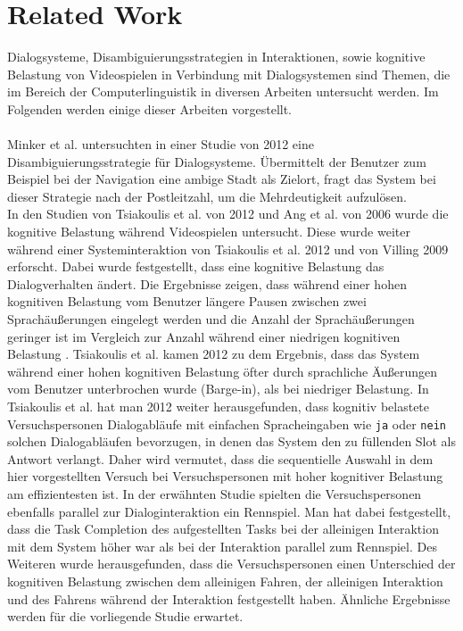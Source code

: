 \documentclass[12pt,a4paper]{scrartcl}
\begin{document}
\newpage
\section{Related Work}

Dialogsysteme, Disambiguierungsstrategien in Interaktionen, sowie kognitive Belastung von Videospielen in Verbindung mit Dialogsystemen sind Themen, die im Bereich der Computerlinguistik in diversen Arbeiten untersucht werden. Im Folgenden werden einige dieser Arbeiten vorgestellt. \\
\\
Minker et al. untersuchten in einer Studie von 2012 eine Disambiguierungsstrategie für Dialogsysteme. Übermittelt der Benutzer zum Beispiel bei der Navigation eine ambige Stadt als Zielort, fragt das System bei dieser Strategie nach der Postleitzahl, um die Mehrdeutigkeit aufzulösen. \\
In den Studien von Tsiakoulis et al. von 2012 und Ang et al. von 2006 wurde die kognitive Belastung während Videospielen untersucht. Diese wurde weiter während einer Systeminteraktion von Tsiakoulis et al. 2012 und von Villing 2009 erforscht. Dabei wurde festgestellt, dass eine kognitive Belastung das Dialogverhalten ändert. Die Ergebnisse zeigen, dass während einer hohen kognitiven Belastung vom Benutzer längere Pausen zwischen zwei Sprachäußerungen eingelegt werden und die Anzahl der Sprachäußerungen geringer ist im Vergleich zur Anzahl während einer niedrigen kognitiven Belastung \cite{DbCL}.
Tsiakoulis et al. kamen 2012 zu dem Ergebnis, dass das System während einer hohen kognitiven Belastung öfter durch sprachliche Äußerungen vom Benutzer unterbrochen wurde (Barge-in), als bei niedriger Belastung.
In Tsiakoulis et al.  hat man 2012 weiter herausgefunden, dass kognitiv belastete Versuchspersonen Dialogabläufe mit einfachen Spracheingaben wie \texttt{ja} oder \texttt{nein} solchen Dialogabläufen bevorzugen, in denen das System den zu füllenden Slot als Antwort verlangt. Daher wird vermutet, dass die sequentielle Auswahl in dem hier vorgestellten Versuch bei Versuchspersonen mit hoher kognitiver Belastung am effizientesten ist.  In der erwähnten Studie spielten die Versuchspersonen ebenfalls parallel zur Dialoginteraktion ein Rennspiel. Man hat dabei festgestellt, dass die Task Completion des aufgestellten Tasks bei der alleinigen Interaktion mit dem System höher war als bei der Interaktion parallel zum Rennspiel. Des Weiteren wurde herausgefunden, dass die Versuchspersonen einen Unterschied der kognitiven Belastung zwischen dem alleinigen Fahren, der alleinigen Interaktion und des Fahrens während der Interaktion festgestellt haben. Ähnliche Ergebnisse werden für die vorliegende Studie erwartet. \\
\end{document}
